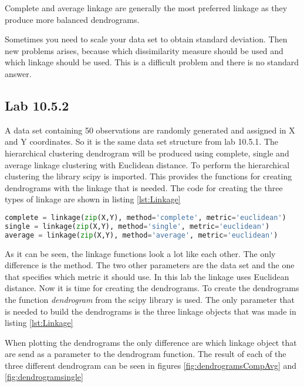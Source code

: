 Complete and average linkage are generally the most preferred linkage as they produce more balanced dendrograms. 

Sometimes you need to scale your data set to obtain standard deviation. Then new problems arises, because which dissimilarity measure should be used and which linkage should be used. This is a difficult problem and there is no standard answer.

\subsection{Lab 10.5.2}
A data set containing 50 observations are randomly generated and assigned in X and Y coordinates. So it is the same data set structure from lab 10.5.1.
The hierarchical clustering dendrogram will be produced using complete, single and average linkage clustering with Euclidean distance.
To perform the hierarchical clustering the library scipy is imported. This provides the functions for creating dendrograms with the linkage that is needed. 
The code for creating the three types of linkage are shown in listing
\ref{lst:Linkage}

\begin{lstlisting}[language=Python, label=lst:Linkage, caption=The code that apllies the three different linkage on the data set]
complete = linkage(zip(X,Y), method='complete', metric='euclidean')
single = linkage(zip(X,Y), method='single', metric='euclidean') 
average = linkage(zip(X,Y), method='average', metric='euclidean')
\end{lstlisting}

As it can be seen, the linkage functions look a lot like each other. The only difference is the method. The two other parameters are the data set and the one that specifies which metric it should use. In this lab the linkage uses Euclidean distance. 
Now it is time for creating the dendrograms. To create the dendrograms the function \emph{dendrogram} from the scipy library is used. The only parameter that is needed to build the dendrograms is the three linkage objects that was made in listing \ref{lst:Linkage}

When plotting the dendrograms the only difference are which linkage object that are send as a parameter to the dendrogram function.
The result of each of the three different dendrogram can be seen in figures \ref{fig:dendrogramsCompAvg} and \ref{fig:dendrogramsingle}




